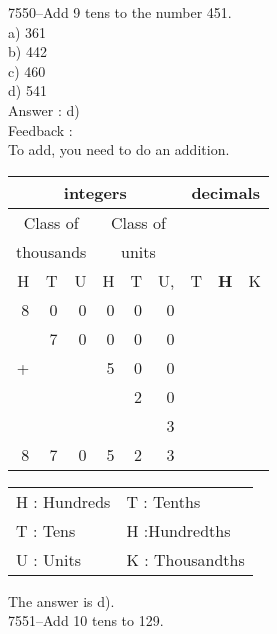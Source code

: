 \documentclass[letterpaper, 12pt]{article}
\begin{document}
7550--Add 9 tens to the number 451.\\

a) 361\\
b) 442\\
c) 460\\
d) 541\\

Answer : d)\\

Feedback :\\
To add, you need to do an addition.
\begin{center}
\begin{tabular}{|rrr|rrr|rrr|}
\hline
\multicolumn{6}{|c|}{integers} &\multicolumn{3}{|c|}{decimals} \\
\hline
\multicolumn{3}{|c|}{Class of} &\multicolumn{3}{|c|}{Class of} &  \multicolumn{3}{c|}{} \\
\multicolumn{3}{|c|}{thousands} &\multicolumn{3}{|c|}{units} &  \multicolumn{3}{c|}{} \\
\hline
H & T & U &H & T & U, & T\up{th} & \textbf{H\up{th}} & K\up{th} \\
\hline
\hline
8 & 0 & 0 & 0 & 0 & 0 &  & &\\
 & 7 & 0 & 0 & 0 & 0 &  & &\\
+ &  &  & 5 & 0 & 0 &  & &\\
 &  &  &  & 2 & 0 &  & &\\
 &  &  &  &  & 3 &  & &\\
\hline
\hline
 8 & 7 & 0 & 5 & 2 & 3 &  & &
\\
\hline
\end{tabular}
\end{center}

\scriptsize
\begin{center}
\begin{tabular}{ll}
H : Hundreds & T\up{th} : Tenths\\
T : Tens & H\up{th} :Hundredths\\
U : Units & K\up{e} : Thousandths\\
\end{tabular}
\end{center}

\normalsize
The answer is d).\\






7551--Add 10 tens to 129.\\
\end{document}
